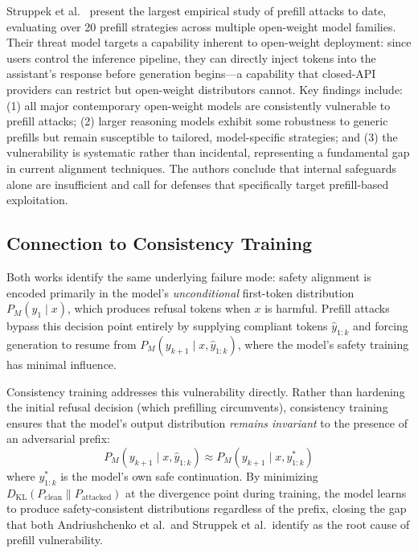 \documentclass{article}
\begin{document}
Struppek et al.~\cite{struppek2025prefill} present the largest empirical study of prefill attacks to date, evaluating over 20 prefill strategies across multiple open-weight model families. Their threat model targets a capability inherent to open-weight deployment: since users control the inference pipeline, they can directly inject tokens into the assistant's response before generation begins---a capability that closed-API providers can restrict but open-weight distributors cannot. Key findings include: (1) all major contemporary open-weight models are consistently vulnerable to prefill attacks; (2) larger reasoning models exhibit some robustness to generic prefills but remain susceptible to tailored, model-specific strategies; and (3) the vulnerability is systematic rather than incidental, representing a fundamental gap in current alignment techniques. The authors conclude that internal safeguards alone are insufficient and call for defenses that specifically target prefill-based exploitation.

\subsection{Connection to Consistency Training}

Both works identify the same underlying failure mode: safety alignment is encoded primarily in the model's \emph{unconditional} first-token distribution $P_M(y_1 \mid x)$, which produces refusal tokens when $x$ is harmful. Prefill attacks bypass this decision point entirely by supplying compliant tokens $\hat{y}_{1:k}$ and forcing generation to resume from $P_M(y_{k+1} \mid x, \hat{y}_{1:k})$, where the model's safety training has minimal influence.

Consistency training addresses this vulnerability directly. Rather than hardening the initial refusal decision (which prefilling circumvents), consistency training ensures that the model's output distribution \emph{remains invariant} to the presence of an adversarial prefix:
\begin{equation}
    P_M(y_{k+1} \mid x, \hat{y}_{1:k}) \approx P_M(y_{k+1} \mid x, y^*_{1:k})
\end{equation}
where $y^*_{1:k}$ is the model's own safe continuation. By minimizing $D_{\text{KL}}(P_{\text{clean}} \| P_{\text{attacked}})$ at the divergence point during training, the model learns to produce safety-consistent distributions regardless of the prefix, closing the gap that both Andriushchenko et al.\ and Struppek et al.\ identify as the root cause of prefill vulnerability.
\end{document}
